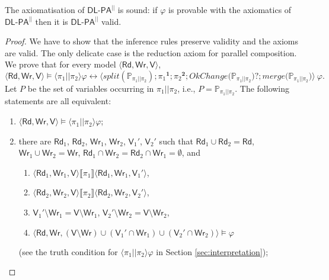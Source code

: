 \documentclass{llncs}
\newcommand{\cp}[2]{{#2}^\mathbf{#1}}
\newcommand{\pll}{ {||} }							%
\newcommand{\readset}{\mathsf{Rd}}
\newcommand{\valuset}{\mathsf{V}}
\newcommand{\writeset}{\mathsf{Wr}}
\newcommand{\testpdl}{?}				%
\newcommand{\DlpaPll}{\ensuremath{\mathsf{DL\text{-}PA}^\pll}\xspace}
\newcommand{\intPgm}[1]{\llbracket #1 \rrbracket}
\newcommand{\ldia}[1]{ \big\langle #1 \big\rangle}
\newcommand{\leqv}{ \leftrightarrow }
\renewcommand{\phi}{\varphi}
\newcommand{\propset}{\mathbb P}
\newcommand{\propsetOf}[1]{\propset_{#1}}
\newcommand{\tuple}[1]{ \langle #1 \rangle}
\begin{document}
\begin{theorem}
The axiomatisation of \DlpaPll is sound:
if $\phi$ is provable with the axiomatics of \DlpaPll then it is \DlpaPll valid.
\end{theorem}
\begin{proof}
We have to show that the inference rules preserve validity and the axioms are valid. 
The only delicate case is the reduction axiom for parallel composition.
We prove that for every model $\tuple{\readset,\writeset,\valuset}$,
$$ \tuple{\readset,\writeset,\valuset} \models \ldia{\pi_1 \pll \pi_2}  \phi \leqv  
\ldia{ 
\mathit{split}( \propsetOf{\pi_1 \pll \pi_2} ) ; 
\cp 1 {\pi_1} ; \cp 2 {\pi_2} ; 
\mathit{OkChange} \big(\propsetOf{\pi_1 \pll \pi_2} \big) \testpdl ;
\mathit{merge} \big(\propsetOf{\pi_1 \pll \pi_2} \big)
} ~ \phi . $$
Let $P$ be the set of variables occurring in $\pi_1 \pll \pi_2$, i.e., $P = \propsetOf{\pi_1 \pll \pi_2}$.
The following statements are all equivalent: %
\begin{enumerate}
\item
$ \tuple{\readset,\writeset,\valuset} \models \ldia{\pi_1 \pll \pi_2}  \phi $;

\item
there are 
$\readset_1$, $\readset_2$, $\writeset_1$, $\writeset_2$, $\valuset_1'$, $\valuset_2'$ such that 
$\readset_1 \cup \readset_2 = \readset$, $\writeset_1 \cup \writeset_2 = \writeset$, 
$\readset_1 \cap \writeset_2 = \readset_2 \cap \writeset_1 = \emptyset$, and
 \begin{enumerate}
 \item
$\tuple{\readset_1,\writeset_1,\valuset} \intPgm{\pi_1} \tuple{\readset_1,\writeset_1,\valuset_1'}$,
 \item
$\tuple{\readset_2,\writeset_2,\valuset} \intPgm{\pi_2} \tuple{\readset_2,\writeset_2,\valuset_2'}$,
 \item
$\valuset_1' \setminus \writeset_1 = \valuset \setminus \writeset_1 $,
$\valuset_2' \setminus \writeset_2 = \valuset \setminus \writeset_2 $,
 \item
$\tuple{\readset,\writeset, 
(\valuset {\setminus} \writeset) \cup (\valuset_1' {\cap} \writeset_1) \cup (\valuset_2' {\cap} \writeset_2) } \models \phi$ 
\end{enumerate}
(see the truth condition for $\ldia{\pi_1 \pll \pi_2}  \phi $ in Section \ref{sec:interpretation});


\end{enumerate}
\end{proof}
\end{document}
